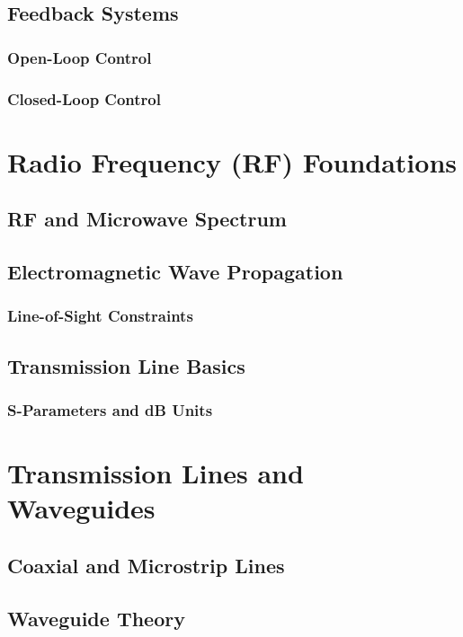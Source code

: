 \documentclass[11pt]{article}
\begin{document}
\subsection{Feedback Systems} \label{subsec:feedback}
\subsubsection{Open-Loop Control}
\subsubsection{Closed-Loop Control}

\section{Radio Frequency (RF) Foundations} \label{sec:rf_foundations}
\subsection{RF and Microwave Spectrum} \label{subsec:rf_spectrum}
\subsection{Electromagnetic Wave Propagation} \label{subsec:wave_propagation}
\subsubsection{Line-of-Sight Constraints}
\subsection{Transmission Line Basics} \label{subsec:transmission_lines}
\subsubsection{S-Parameters and dB Units}

\section{Transmission Lines and Waveguides} \label{sec:waveguides}
\subsection{Coaxial and Microstrip Lines} \label{subsec:coaxial_microstrip}
\subsection{Waveguide Theory} \label{subsec:waveguide_theory}
\end{document}
